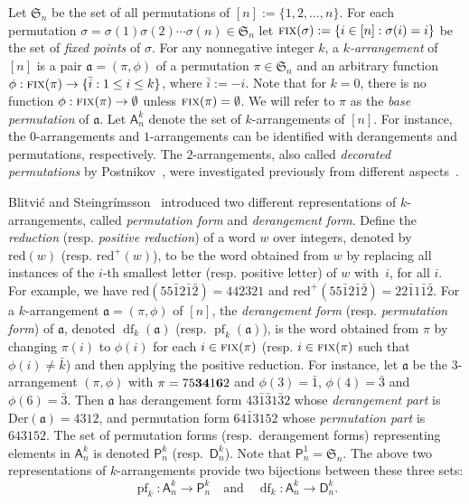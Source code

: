 \documentclass[12pt]{amsart}
\numberwithin{equation}{section}
\theoremstyle{plain}
\theoremstyle{definition}
\newcommand\A{\mathsf{A}}
\renewcommand\P{\mathsf{P}}
\newcommand\D{\mathsf{D}}
\def\reduction{\mathrm{red}}
\def\Der{\mathrm{Der}}
\def\Fix{\hbox{\rm\textsc{fix}}}
\def\S{\mathfrak{S}}
\def\a{\mathfrak{a}}
\def\df{\operatorname{df}}
\def\pf{\operatorname{pf}}
\def\neg#1{{{{\bar#1}}}}
\begin{document}
Let $\S_n$ be the set of all permutations of $[n]:=\{1,2,\ldots,n\}$. 
For each permutation 
$\sigma=\sigma(1)\sigma(2)\cdots\sigma(n) \in\S_n$ 
let $\Fix(\sigma):=\{i\in[n]:\sigma(i)=i\}$ 
be the set of {\em fixed points} of $\sigma$. 
For any nonnegative integer $k$, a {\em$k$-arrangement} of $[n]$ is a 
pair $\mathfrak{a}=(\pi,\phi)$ of a permutation $\pi\in\S_n$ 
and an arbitrary function
$\phi:\Fix(\pi)\rightarrow\{\neg i: 1\leq i\leq k\}$, 
where $\neg i:=-i$. Note that for $k=0$,  there is no function $\phi:\Fix(\pi)\rightarrow\emptyset$ unless $\Fix(\pi)=\emptyset$.  We will refer to $\pi$ as the {\em base permutation} of $\a$. Let $\A_n^k$ denote the set of $k$-arrangements of $[n]$.  
For instance, the $0$-arrangements and $1$-arrangements can be identified with derangements and permutations, respectively. 
The $2$-arrangements, also called  {\it decorated permutations} by Postnikov~\cite[Def.~13.3]{po}, were investigated previously from different aspects~\cite{cor,lwz,po,wi}.  




Blitvi\'c and Steingr\'imsson~\cite{bs} introduced two different representations of $k$-arrangements, called {\em permutation form} and {\em derangement form}. 
Define the {\em reduction} (resp. {\em positive reduction})  of a word $w$ over integers, denoted by $\reduction(w)$ (resp. $\reduction^+(w)$),  to be the word obtained from $w$ by replacing all instances of 
the $i$-th smallest letter (resp. positive letter) of $w$ with~$i$, for all $i$. For example, we have $\reduction(55\neg12\neg1\neg2)=442321$
and $\reduction^+(55\neg12\neg1\neg2)=22\neg11\neg1\neg2$.
For a $k$-arrangement $\a=(\pi,\phi)$ of $[n]$, the {\em derangement form} (resp. {\em permutation form}) of $\a$, denoted $\df_k(\a)$ (resp. $\pf_k(\a)$),  is the word obtained from $\pi$ by changing $\pi(i)$ to $\phi(i)$ 
for each $i\in\Fix(\pi)$  (resp. $i\in\Fix(\pi)$ such that $\phi(i)\neq \neg k$) and then applying the positive reduction. 
For instance,  let $\a$ be the $3$-arrangement $(\pi, \phi)$ with $\pi=75{\bf3}{\bf4}1{\bf6}2$ and $\phi(3)=\neg 1$, $\phi(4)=\neg 3$ and $\phi(6)=\neg 3$. 
Then $\a$ has derangement form $43\neg1\neg31\neg32$ whose {\em derangement part} is $\Der(\a)=4312$, and 
permutation form $64\neg13152$ whose {\em permutation part} is $643152$. 
The set of permutation forms (resp.~derangement forms) representing elements in $\A_n^k$ is denoted $\P_n^k$ (resp.~$\D_n^k$). Note that $\P_n^1=\S_n$.
The above two representations of $k$-arrangements provide	
two bijections between these three sets:
	$$\pf_k: \A_n^k\rightarrow \P_n^k \quad \text{and} \quad \df_k: \A_n^k\rightarrow \D_n^k.$$
\end{document}
